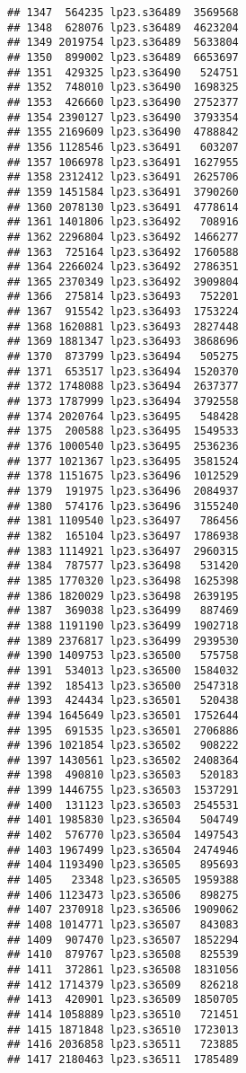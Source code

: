 \documentclass[
]{article}
\begin{document}
\begin{verbatim}
## 1347  564235 lp23.s36489  3569568
## 1348  628076 lp23.s36489  4623204
## 1349 2019754 lp23.s36489  5633804
## 1350  899002 lp23.s36489  6653697
## 1351  429325 lp23.s36490   524751
## 1352  748010 lp23.s36490  1698325
## 1353  426660 lp23.s36490  2752377
## 1354 2390127 lp23.s36490  3793354
## 1355 2169609 lp23.s36490  4788842
## 1356 1128546 lp23.s36491   603207
## 1357 1066978 lp23.s36491  1627955
## 1358 2312412 lp23.s36491  2625706
## 1359 1451584 lp23.s36491  3790260
## 1360 2078130 lp23.s36491  4778614
## 1361 1401806 lp23.s36492   708916
## 1362 2296804 lp23.s36492  1466277
## 1363  725164 lp23.s36492  1760588
## 1364 2266024 lp23.s36492  2786351
## 1365 2370349 lp23.s36492  3909804
## 1366  275814 lp23.s36493   752201
## 1367  915542 lp23.s36493  1753224
## 1368 1620881 lp23.s36493  2827448
## 1369 1881347 lp23.s36493  3868696
## 1370  873799 lp23.s36494   505275
## 1371  653517 lp23.s36494  1520370
## 1372 1748088 lp23.s36494  2637377
## 1373 1787999 lp23.s36494  3792558
## 1374 2020764 lp23.s36495   548428
## 1375  200588 lp23.s36495  1549533
## 1376 1000540 lp23.s36495  2536236
## 1377 1021367 lp23.s36495  3581524
## 1378 1151675 lp23.s36496  1012529
## 1379  191975 lp23.s36496  2084937
## 1380  574176 lp23.s36496  3155240
## 1381 1109540 lp23.s36497   786456
## 1382  165104 lp23.s36497  1786938
## 1383 1114921 lp23.s36497  2960315
## 1384  787577 lp23.s36498   531420
## 1385 1770320 lp23.s36498  1625398
## 1386 1820029 lp23.s36498  2639195
## 1387  369038 lp23.s36499   887469
## 1388 1191190 lp23.s36499  1902718
## 1389 2376817 lp23.s36499  2939530
## 1390 1409753 lp23.s36500   575758
## 1391  534013 lp23.s36500  1584032
## 1392  185413 lp23.s36500  2547318
## 1393  424434 lp23.s36501   520438
## 1394 1645649 lp23.s36501  1752644
## 1395  691535 lp23.s36501  2706886
## 1396 1021854 lp23.s36502   908222
## 1397 1430561 lp23.s36502  2408364
## 1398  490810 lp23.s36503   520183
## 1399 1446755 lp23.s36503  1537291
## 1400  131123 lp23.s36503  2545531
## 1401 1985830 lp23.s36504   504749
## 1402  576770 lp23.s36504  1497543
## 1403 1967499 lp23.s36504  2474946
## 1404 1193490 lp23.s36505   895693
## 1405   23348 lp23.s36505  1959388
## 1406 1123473 lp23.s36506   898275
## 1407 2370918 lp23.s36506  1909062
## 1408 1014771 lp23.s36507   843083
## 1409  907470 lp23.s36507  1852294
## 1410  879767 lp23.s36508   825539
## 1411  372861 lp23.s36508  1831056
## 1412 1714379 lp23.s36509   826218
## 1413  420901 lp23.s36509  1850705
## 1414 1058889 lp23.s36510   721451
## 1415 1871848 lp23.s36510  1723013
## 1416 2036858 lp23.s36511   723885
## 1417 2180463 lp23.s36511  1785489

\end{verbatim}
\end{document}

